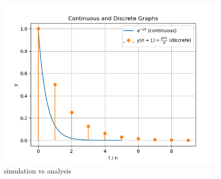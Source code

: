 \documentclass[journal,12pt,twocolumn]{IEEEtran}
\begin{document}
\begin{figure}[h!]
    \centering
    \includegraphics[width=\columnwidth]{figs/graph.png}
    \caption{simulation vs analysis}
\end{figure}
\end{document}
